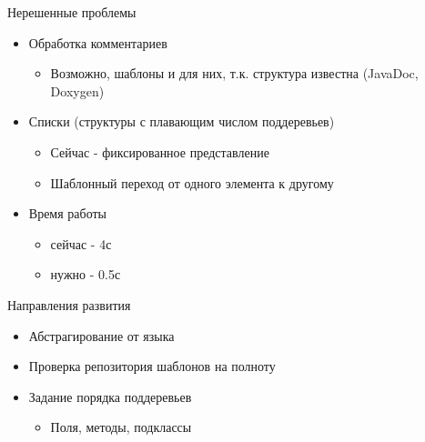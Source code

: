 \documentclass[sans]{beamer}
\begin{document}
\begin{frame}{Нерешенные проблемы}
  \begin{itemize}
    \item Обработка комментариев
      \begin{itemize}
        \item Возможно, шаблоны и для них, т.к. структура известна (JavaDoc, Doxygen) 
      \end{itemize}
    \item Списки (структуры с плавающим числом поддеревьев)
      \begin{itemize}
        \item Сейчас - фиксированное представление
        \item Шаблонный переход от одного элемента к другому
      \end{itemize}
    \item Время работы
      \begin{itemize}
        \item сейчас - 4с
        \item нужно  - 0.5с
      \end{itemize}
  \end{itemize}
\end{frame}

\begin{frame}{Направления развития}
  \begin{itemize}
    \item Абстрагирование от языка
    \item Проверка репозитория шаблонов на полноту
    \item Задание порядка поддеревьев
      \begin{itemize}
        \item Поля, методы, подклассы
      \end{itemize}
  \end{itemize}
\end{frame}
\end{document}
